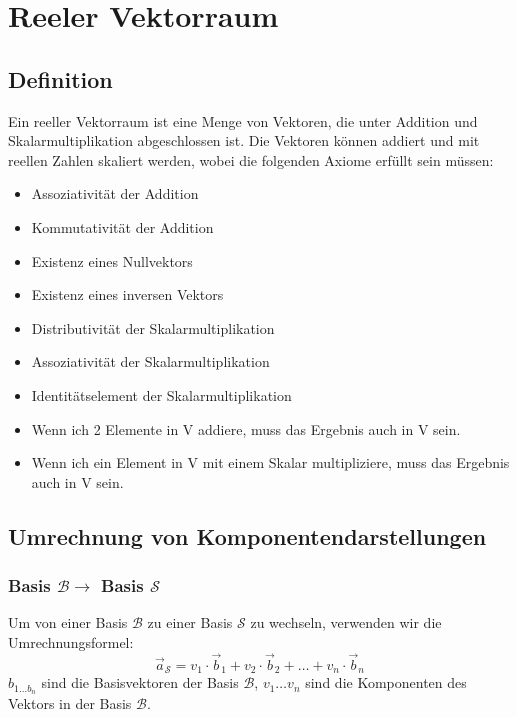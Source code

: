 \documentclass{article}
\begin{document}
\section*{Reeler Vektorraum}
\begin{minipage}[t]{0.45\textwidth}
    \subsection*{Definition}
    Ein reeller Vektorraum ist eine Menge von Vektoren, die unter Addition und Skalarmultiplikation abgeschlossen ist. 
    Die Vektoren können addiert und mit reellen Zahlen skaliert werden, wobei die folgenden Axiome erfüllt sein müssen:
    \begin{itemize}
        \item Assoziativität der Addition
        \item Kommutativität der Addition
        \item Existenz eines Nullvektors
        \item Existenz eines inversen Vektors
        \item Distributivität der Skalarmultiplikation
        \item Assoziativität der Skalarmultiplikation
        \item Identitätselement der Skalarmultiplikation
        \item Wenn ich 2 Elemente in V addiere, muss das Ergebnis auch in V sein.
        \item Wenn ich ein Element in V mit einem Skalar multipliziere, muss das Ergebnis auch in V sein.
    \end{itemize}

    \subsection*{Umrechnung von Komponentendarstellungen}
    \subsubsection*{Basis $\mathcal{B} \to$ Basis $\mathcal{S}$}
    Um von einer Basis \( \mathcal{B} \)  zu einer Basis \( \mathcal{S} \) zu wechseln, verwenden wir die Umrechnungsformel:
    \begin{equation*}
        \vec{a}_{\mathcal{S}} = v_1 \cdot \vec{b}_1 + v_2 \cdot \vec{b}_2 + \ldots + v_n \cdot \vec{b}_n
    \end{equation*}
    $b_{1 \ldots b_n}$ sind die Basisvektoren der Basis $\mathcal{B}$, $v_1 \ldots v_n$ sind die Komponenten des Vektors in der Basis $\mathcal{B}$.


\end{minipage}
\end{document}
